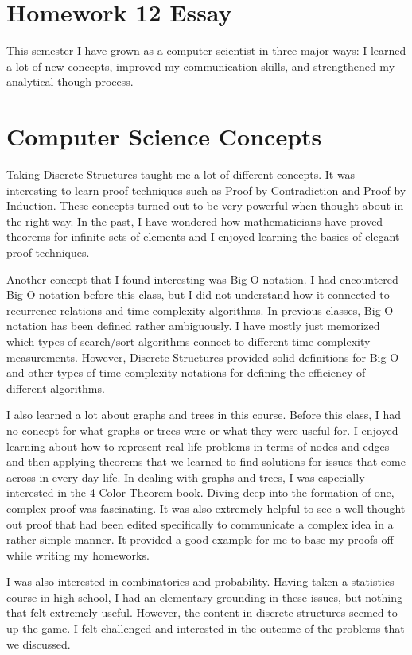 \documentclass{article}
\author{Nathan Stouffer}
\begin{document}
\section*{Homework 12 Essay}

This semester I have grown as a computer scientist in three major ways: I learned a lot of new concepts, improved my communication skills, and strengthened my analytical though process.

\section*{Computer Science Concepts}

Taking Discrete Structures taught me a lot of different concepts. It was interesting to learn proof techniques such as Proof by Contradiction and Proof by Induction. These concepts turned out to be very powerful when thought about in the right way. In the past, I have wondered how mathematicians have proved theorems for infinite sets of elements and I enjoyed learning the basics of elegant proof techniques.

Another concept that I found interesting was Big-O notation. I had encountered Big-O notation before this class, but I did not understand how it connected to recurrence relations and time complexity algorithms. In previous classes, Big-O notation has been defined rather ambiguously. I have mostly just memorized which types of search/sort algorithms connect to different time complexity measurements. However, Discrete Structures provided solid definitions for Big-O and other types of time complexity notations for defining the efficiency of different algorithms.

I also learned a lot about graphs and trees in this course. Before this class, I had no concept for what graphs or trees were or what they were useful for. I enjoyed learning about how to represent real life problems in terms of nodes and edges and then applying theorems that we learned to find solutions for issues that come across in every day life. In dealing with graphs and trees, I was especially interested in the 4 Color Theorem book. Diving deep into the formation of one, complex proof was fascinating. It was also extremely helpful to see a well thought out proof that had been edited specifically to communicate a complex idea in a rather simple manner. It provided a good example for me to base my proofs off while writing my homeworks.

I was also interested in combinatorics and probability. Having taken a statistics course in high school, I had an elementary grounding in these issues, but nothing that felt extremely useful. However, the content in discrete structures seemed to up the game. I felt challenged and interested in the outcome of the problems that we discussed.
\end{document}
